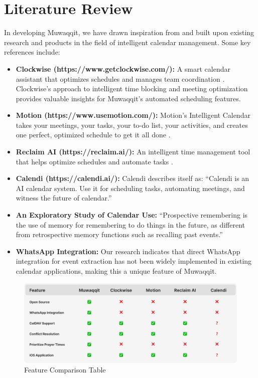 \documentclass[12pt,a4paper]{article}
\begin{document}
\section{Literature Review}

In developing Muwaqqit, we have drawn inspiration from and built upon existing research and products in the field of intelligent calendar management. Some key references include:

\begin{itemize}
    \item \textbf{Clockwise (https://www.getclockwise.com/):} A smart calendar assistant that optimizes schedules and manages team coordination \cite{clockwise}. Clockwise's approach to intelligent time blocking and meeting optimization provides valuable insights for Muwaqqit's automated scheduling features.
    \item \textbf{Motion (https://www.usemotion.com/):} Motion's Intelligent Calendar takes your meetings, your tasks, your to-do list, your activities, and creates one perfect, optimized schedule to get it all done \cite{motion}.
    \item \textbf{Reclaim AI (https://reclaim.ai/):} An intelligent time management tool that helps optimize schedules and automate tasks \cite{reclaim}.
    \item \textbf{Calendi (https://calendi.ai/):} Calendi describes itself as: ``Calendi is an AI calendar system. Use it for scheduling tasks, automating meetings, and witness the future of calendar.'' \cite{calendi}
    \item \textbf{An Exploratory Study of Calendar Use:} ``Prospective remembering is the use of memory for remembering to do things in the future, as different from retrospective memory functions such as recalling past events.'' \cite{tungare2008exploratorystudycalendaruse}
    \item \textbf{WhatsApp Integration:} Our research indicates that direct WhatsApp integration for event extraction has not been widely implemented in existing calendar applications, making this a unique feature of Muwaqqit.
\end{itemize}

\begin{figure}[!h]
    \centering
    \includegraphics[width=\textwidth]{images/features-table.png}
    \caption{Feature Comparison Table}
    \label{fig:features-table}
\end{figure}
\end{document}
